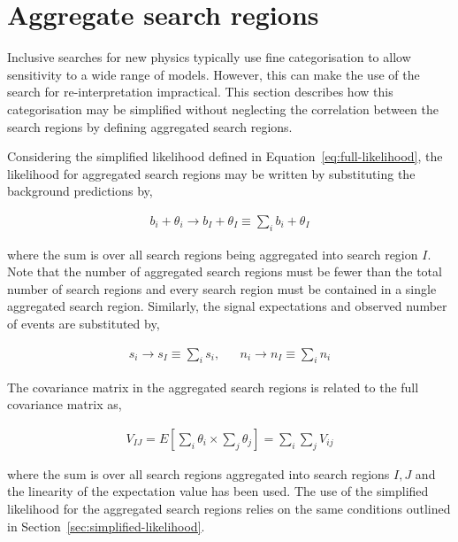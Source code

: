 \section{Aggregate search regions}
\label{sec:aggregate-signal-regions}

Inclusive searches for new physics typically use fine categorisation to allow
sensitivity to a wide range of models. However, this can make the use
of the search for re-interpretation impractical. 
This section describes how this categorisation may be simplified without neglecting the correlation 
between the search regions by defining aggregated search regions.

Considering the simplified likelihood defined in Equation~\ref{eq:full-likelihood},
the likelihood for aggregated search regions may be written by substituting the 
background predictions by,

\begin{align}
b_{i} + \theta_i \rightarrow b_I + \theta_I \equiv \sum_{i}b_{i} + \theta_I
\label{eq:b-agg}
\end{align}

where the sum is over all search regions being aggregated into search region $I$.
Note that the number of aggregated search regions must be fewer than the total number of search regions and 
every search region must be contained in a single aggregated search region. 
Similarly, the signal expectations and observed number of events are substituted by, 

\begin{align}
 s_{i}  \rightarrow s_{I} \equiv \sum_{i}s_{i},  &&  n_{i}  \rightarrow n_{I} \equiv \sum_{i}n_{i} 
\label{eq:b-agg}
\end{align}


The covariance matrix in the aggregated search regions is related to the full covariance matrix as, 

\begin{align}
V_{IJ}=E[\sum_{i}\theta_{i}\times\sum_{j}\theta_{j}] = \sum_{i}\sum_{j}V_{ij}
\label{eq:agg-cov}
\end{align}

where the sum is over all search regions aggregated into search regions $I,J$ and the linearity of the expectation
value has been used.  The use of the simplified likelihood for the aggregated search regions 
relies on the same conditions outlined in Section~\ref{sec:simplified-likelihood}. 

